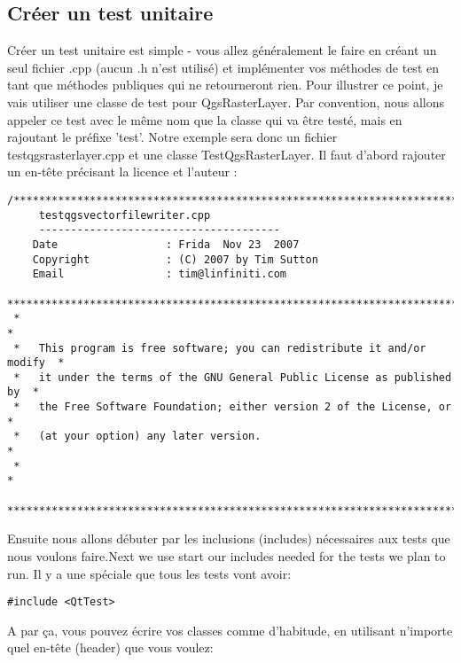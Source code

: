 \subsection{Cr\'eer un test unitaire}
Cr\'eer un test unitaire est simple - vous allez g\'en\'eralement le faire en cr\'eant un seul fichier .cpp (aucun .h n'est utilis\'e) et impl\'ementer vos m\'ethodes de test en tant que m\'ethodes publiques qui ne retourneront rien. Pour illustrer ce point, je vais utiliser une classe de test pour QgsRasterLayer. Par convention, nous allons appeler ce test avec le m\^eme nom que la classe qui va \^etre test\'e, mais en rajoutant le pr\'efixe 'test'. Notre exemple sera donc un fichier testqgsrasterlayer.cpp et une classe TestQgsRasterLayer. Il faut d'abord rajouter un en-t\^ete pr\'ecisant la licence et l'auteur :

\newpage

\begin{verbatim}
/***************************************************************************
     testqgsvectorfilewriter.cpp
     --------------------------------------
    Date                 : Frida  Nov 23  2007
    Copyright            : (C) 2007 by Tim Sutton
    Email                : tim@linfiniti.com
 ***************************************************************************
 *                                                                         *
 *   This program is free software; you can redistribute it and/or modify  *
 *   it under the terms of the GNU General Public License as published by  *
 *   the Free Software Foundation; either version 2 of the License, or     *
 *   (at your option) any later version.                                   *
 *                                                                         *
 ***************************************************************************/
\end{verbatim}

Ensuite nous allons d\'ebuter par les inclusions (includes) n\'ecessaires aux tests que nous voulons faire.Next we use start our includes needed for the tests we plan to run. Il y a une sp\'eciale que tous les tests vont avoir:

\begin{verbatim}
#include <QtTest>
\end{verbatim}

A par \c{c}a, vous pouvez \'ecrire vos classes comme d'habitude, en utilisant n'importe quel en-t\^ete (header) que vous voulez:

